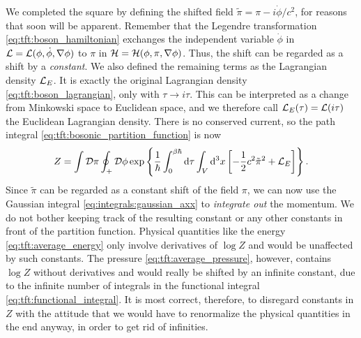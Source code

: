 We completed the square by defining the shifted field $\tilde\pi = \pi - i \dot\phi / c^2$, for reasons that soon will be apparent.
Remember that the Legendre transformation \eqref{eq:tft:boson_hamiltonian} exchanges the independent variable $\dot\phi$ in $\mathcal{L} = \mathcal{L}(\phi, \dot\phi, \nabla\phi)$ to $\pi$ in $\mathcal{H} = \mathcal{H}(\phi, \pi, \nabla\phi)$.
Thus, the shift can be regarded as a shift by a \emph{constant}.
We also defined the remaining terms as the Lagrangian density $\mathcal{L}_E$.
It is exactly the original Lagrangian density \eqref{eq:tft:boson_lagrangian}, only with $\tau \rightarrow i \tau$.
This can be interpreted as a change from Minkowski space to Euclidean space, and we therefore call $\mathcal{L}_E(\tau) = \mathcal{L}(i \tau)$ the Euclidean Lagrangian density.
There is no conserved current, so the path integral \eqref{eq:tft:bosonic_partition_function} is now
\begin{equation}
	Z = \int \mathcal{D} \pi \oint_+ \mathcal{D} \phi \exp \left\{ \frac{1}{\hbar} \int_0^{\beta \hbar} \mathop{}\!\mathrm{d} \tau \int_V \mathop{}\!\mathrm{d}^3 x \left[ - \frac12 c^2 \tilde\pi^2 + \mathcal{L}_E \right] \right\} .
\label{eq:tft:boson_integrate_out_momentum}
\end{equation}
\label{tft:pressure_renormalization_discussion}%
Since $\tilde\pi$ can be regarded as a constant shift of the field $\pi$, we can now use the Gaussian integral \eqref{eq:integrals:gaussian_axx} to \emph{integrate out} the momentum. 
We do not bother keeping track of the resulting constant or any other constants in front of the partition function.
Physical quantities like the energy \eqref{eq:tft:average_energy} only involve derivatives of $\log Z$ and would be unaffected by such constants.
The pressure \eqref{eq:tft:average_pressure}, however, contains $\log Z$ without derivatives and would really be shifted by an infinite constant, due to the infinite number of integrals in the functional integral \eqref{eq:tft:functional_integral}.
It is most correct, therefore, to disregard constants in $Z$ with the attitude that we would have to renormalize the physical quantities in the end anyway, in order to get rid of infinities.

